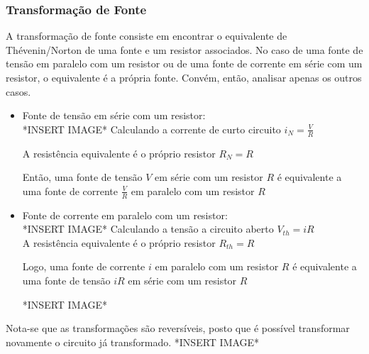 \documentclass{article}
\numberwithin{equation}{section}
\begin{document}
    \subsubsection{Transformação de Fonte}
    \label{subsubsec:transform}
    A transformação de fonte consiste em encontrar o equivalente de Thévenin/Norton de uma fonte e um resistor associados. No caso de uma fonte de tensão em paralelo com um resistor ou de uma fonte de corrente em série com um resistor, o equivalente é a própria fonte. Convém, então, analisar apenas os outros casos.
    \begin{itemize}
        \item Fonte de tensão em série com um resistor: \\
            *INSERT IMAGE* %
            Calculando a corrente de curto circuito $i_{N}=\frac{V}{R}$

            A resistência equivalente é o próprio resistor $R_{N}=R$

            Então, uma fonte de tensão $V$ em série com um resistor $R$ é equivalente a uma fonte de corrente $\frac{V}{R}$ em paralelo com um resistor $R$
        \item Fonte de corrente em paralelo com um resistor: \\
            *INSERT IMAGE*
            Calculando a tensão a circuito aberto $V_{th}=iR$ \\
            A resistência equivalente é o próprio resistor $R_{th}=R$

            Logo, uma fonte de corrente $i$ em paralelo com um resistor $R$ é equivalente a uma fonte de tensão $iR$ em série com um resistor $R$

            *INSERT IMAGE*

    \end{itemize}

    Nota-se que as transformações são reversíveis, posto que é possível transformar novamente o circuito já transformado.
    \newline
    *INSERT IMAGE*
\end{document}
